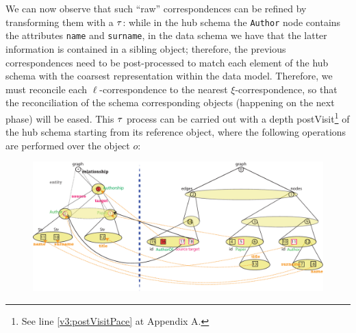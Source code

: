 \begin{example}[continues=ex:examplegraphdata,label=ex:examplereferencedOcaml]
We can now observe that such ``raw'' correspondences  can be refined by  transforming them with a $\ttransl$: while in the hub schema the \texttt{Author} node contains the attributes \texttt{name} and \texttt{surname}, in the data schema we have that the latter information is contained in a sibling object; therefore, the previous correspondences need to be post-processed to match each element of the hub schema with the coarsest representation within the data model. Therefore, we must reconcile each $\ell$-correspondence to the nearest $\xi$-correspondence, so that the reconciliation of the schema corresponding objects (happening on the next phase) will be eased. This $\ttransl$ process can be carried out with a depth postVisit\footnote{See line \ref{v3:postVisitPace} at Appendix A.} of the hub schema starting from its reference object, where the following operations are performed over the object $o$:

\begin{figure}[!t]
	\centering
	\begin{minipage}{\textwidth}
		\centering
		\includegraphics[width=\textwidth]{fig/04model/04aAlignment}
		\label{subfig:match1}
	\end{minipage}
	\medskip
	

\end{figure}
\end{example}
